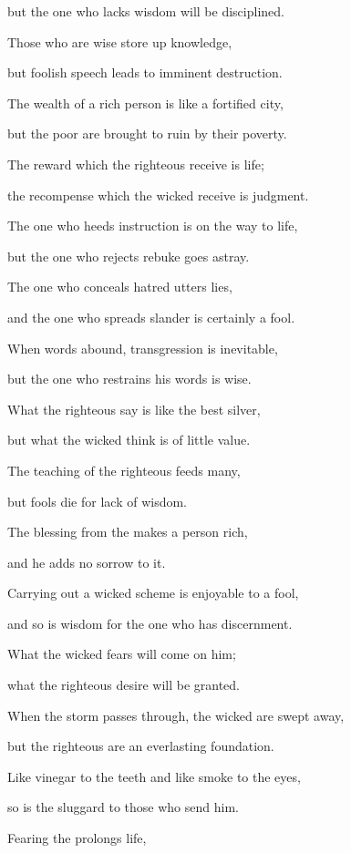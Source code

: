 {\par }{\Q but the one who lacks
wisdom
will be disciplined.
\par }{\Q {}Those who are wise
store
up knowledge,
\par }{\Q but foolish
speech
leads to imminent destruction.
\par }{\Q {}The wealth
of a rich
person is like a fortified
city,
\par }{\Q but the poor
are brought to ruin
by their poverty.
\par }{\Q {}The reward
which the righteous
receive is life;
\par }{\Q the recompense
which the wicked
receive is judgment.
\par }{\Q {}The one who heeds
instruction
is on the way
to life,
\par }{\Q but the one who rejects rebuke
goes astray.
\par }{\Q {}The one who conceals
hatred
utters
lies,
\par }{\Q and the one who spreads
slander
is certainly a fool.
\par }{\Q {}When
words
abound,
transgression
is inevitable,
\par }{\Q but the one who restrains
his words
is wise.
\par }{\Q {}What
the righteous
say is like the best
silver,
\par }{\Q but what
the wicked
think
is of little value.
\par }{\Q {}The teaching
of the righteous
feeds
many,
\par }{\Q but fools
die
for lack
of wisdom.
\par }{\Q {}The blessing
from the
{}
makes a person rich,
\par }{\Q and he adds
no sorrow to it.
\par }{\Q {}Carrying out
a wicked scheme
is enjoyable
to a fool,
\par }{\Q and so is wisdom
for the one
who has discernment.
\par }{\Q {}What the wicked
fears
will come
on him;
\par }{\Q what the righteous
desire
will be granted.
\par }{\Q {}When the storm
passes
through, the wicked
are swept
away,

\par }{\Q but the righteous
are an everlasting
foundation.
\par }{\Q {}Like vinegar
to the teeth
and like smoke
to the eyes,
\par }{\Q so
is the sluggard
to those who send him.
\par }{\Q {}Fearing
the {}
prolongs
life,

}
